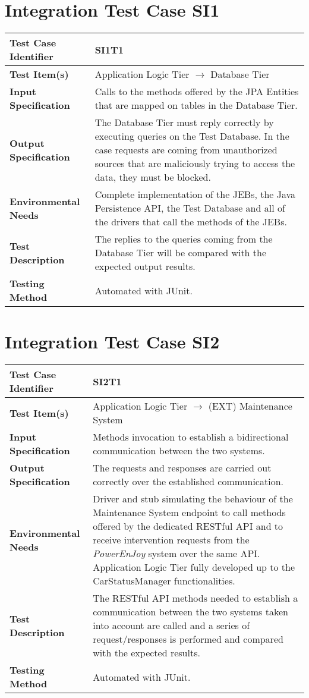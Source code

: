 \section{Integration Test Case SI1}

\begin{longtable}{p{} | p{}}
\hline
\textbf{Test Case Identifier} & SI1T1\\
\hline
\textbf{Test Item(s)} & Application Logic Tier $\rightarrow$ Database Tier \\
\hline
\textbf{Input Specification} & Calls to the methods offered by the JPA Entities that are mapped on tables in the Database Tier. \\
\hline
\textbf{Output Specification} & The Database Tier must reply correctly by executing queries on the Test Database. In the case requests are coming from unauthorized sources that are maliciously trying to access the data, they must be blocked. \\
\hline
\textbf{Environmental Needs} & Complete implementation of the JEBs, the Java Persistence API, the Test Database and all of the drivers that call the methods of the JEBs. \\
\hline
\textbf{Test Description} & The replies to the queries coming from the Database Tier will be compared with the expected output results. \\
\hline
\textbf{Testing Method} & Automated with JUnit. \\
\hline
\end{longtable}

\section{Integration Test Case SI2}

\begin{longtable}{p{} | p{}}
\hline
\textbf{Test Case Identifier} & SI2T1\\
\hline
\textbf{Test Item(s)} & Application Logic Tier $\rightarrow$ (EXT) Maintenance System \\
\hline
\textbf{Input Specification} & Methods invocation to establish a bidirectional communication between the two systems. \\
\hline
\textbf{Output Specification} & The requests and responses are carried out correctly over the established communication. \\
\hline
\textbf{Environmental Needs} & Driver and stub simulating the behaviour of the Maintenance System endpoint to call methods offered by the dedicated RESTful API and to receive intervention requests from the \emph{PowerEnJoy} system over the same API. Application Logic Tier fully developed up to the CarStatusManager functionalities. \\
\hline
\textbf{Test Description} & The RESTful API methods needed to establish a communication between the two systems taken into account are called and a series of request/responses is performed and compared with the expected results. \\
\hline
\textbf{Testing Method} & Automated with JUnit. \\
\hline
\end{longtable}

